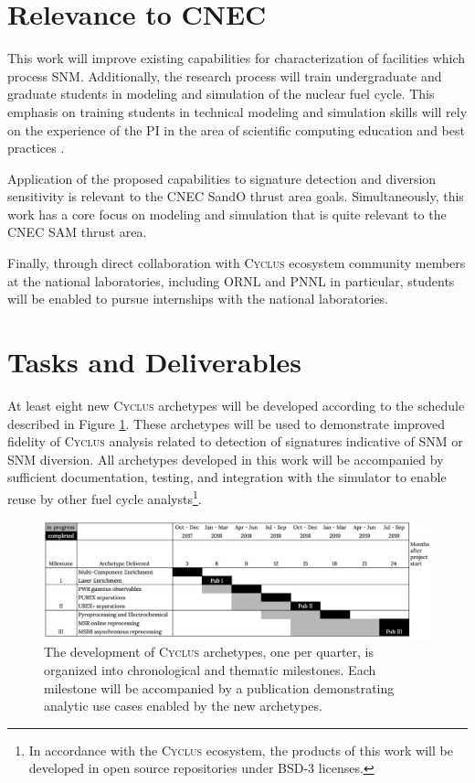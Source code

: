 \documentclass[11pt,letterpaper]{article}
\newcommand{\Cyclus}{\textsc{Cyclus}\xspace}%
\begin{document}
\section{Relevance to CNEC}
This work will improve existing capabilities for characterization of facilities
which process \gls{SNM}. Additionally, the research process will train 
undergraduate and graduate students in modeling and simulation of the nuclear 
fuel cycle. This emphasis on training students in technical modeling and 
simulation skills will rely on the experience of the 
\gls{PI} in the area of scientific computing education and best practices 
\cite{scopatz_effective_2015,wilson_best_2014,huff_lessons_2017,huff_case_2017}.

Application of the proposed capabilities to signature detection and diversion 
sensitivity is relevant to the \gls{CNEC} \gls{SandO} thrust area goals.  
Simultaneously, this work has a core focus on modeling and simulation that is 
quite relevant to the \gls{CNEC} \gls{SAM} thrust area.  

Finally, through direct collaboration with \Cyclus ecosystem community members 
at the national laboratories, including \gls{ORNL} and \gls{PNNL} in particular, students will be enabled to pursue internships with the national laboratories.

\section{Tasks and Deliverables}

At least eight new \Cyclus archetypes will be developed according to the 
schedule described in Figure \ref{fig:milestones}.  These archetypes 
will be used to demonstrate improved fidelity of \Cyclus analysis related to 
detection of signatures indicative of \gls{SNM} or \gls{SNM} diversion. 
All archetypes developed in this work will be accompanied by sufficient 
documentation, testing, and integration with the simulator to enable reuse by 
other fuel cycle analysts\footnote{In accordance with the \Cyclus ecosystem, 
the products of this work will be developed in open source repositories under 
BSD-3 licenses.}.


\begin{figure}[htbp!]
        \begin{center}
                \includegraphics[width=\textwidth]{milestones.png}
        \end{center}
        \caption{The development of \Cyclus archetypes, one per quarter, is 
                organized into chronological and thematic milestones. Each 
                milestone will be  accompanied by a publication demonstrating 
        analytic use cases enabled by the new archetypes.} 
        \label{fig:milestones}
\end{figure}
\end{document}

